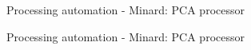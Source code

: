 \documentclass[xcolor=table]{beamer}
\begin{document}
\begin{frame}{Processing automation - Minard: PCA processor}
\noindent{}
\end{frame}

\begin{frame}{Processing automation - Minard: PCA processor}
\noindent{}
\end{frame}
\end{document}
